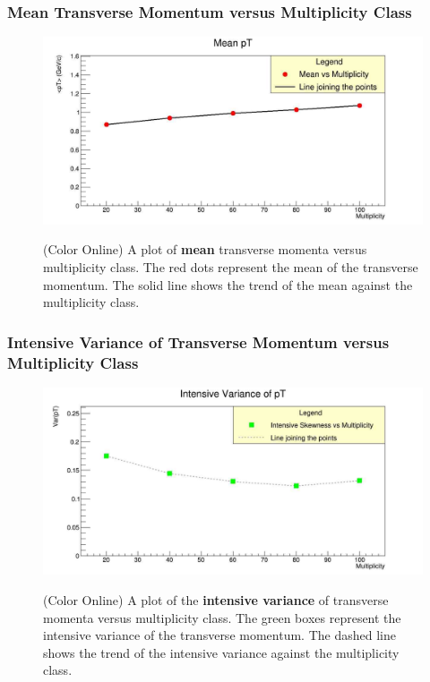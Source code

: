 \documentclass[letterpaper,aps,prc,superscriptaddress,nofootinbib,10pt,showpacs,floatfix]{revtex4-2}%
\begin{document}
\subsubsection{Mean Transverse Momentum versus Multiplicity Class}
\label{subsubsec:mean}
\vspace{-5mm}
\begin{figure}[!htb]
	\begin{minipage}{0.9\textwidth}
   		\label{Fig:6}
     	\centering
     	\renewcommand{\thefigure}{6}
     	\includegraphics[width=0.9\linewidth]{mean}
     	\caption{(Color Online) A plot of \textbf{mean} transverse momenta versus multiplicity class. The red dots represent the mean of the transverse momentum. The solid line shows the trend of the mean against the multiplicity class.}
     \end{minipage}
\end{figure}

\FloatBarrier
\vspace{-3mm}
\pagebreak


\subsubsection{Intensive Variance of Transverse Momentum versus Multiplicity Class}
\label{subsubsec:intvar}
\vspace{-5mm}
\begin{figure}[!htb]
\begin{minipage}{0.9\textwidth}
   \label{Fig:7}
     \centering
     \renewcommand{\thefigure}{7}
     \includegraphics[width=0.9\linewidth]{intvar}
     \caption{(Color Online) A plot of the \textbf{intensive variance} of transverse momenta versus multiplicity class. The green boxes represent the intensive variance of the transverse momentum. The dashed line shows the trend of the intensive variance against the multiplicity class.}
\end{minipage}
\end{figure}
\end{document}
